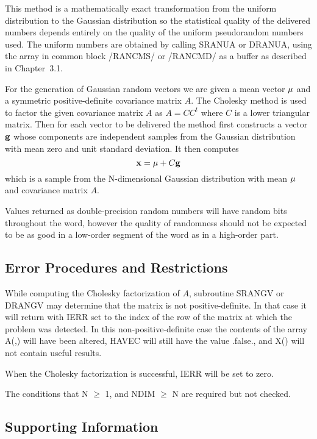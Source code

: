 \documentclass[twoside]{MATH77}
\begin{document}
This method is a mathematically exact transformation from the uniform
distribution to the Gaussian distribution so the statistical quality of the
delivered numbers depends entirely on the quality of the uniform
pseudorandom numbers used. The uniform numbers are obtained by calling
SRANUA or DRANUA, using the array in common block /RANCMS/ or /RANCMD/ as a
buffer as described in Chapter~3.1.

For the generation of Gaussian random vectors we are given a mean vector $%
{\bf \mu }$ and a symmetric positive-definite covariance matrix $A$. The
Cholesky method is used to factor the given covariance matrix $A$ as $A =
CC^t$ where $C$ is a lower triangular matrix. Then for each vector to be
delivered the method first constructs a vector ${\bf g}$ whose components
are independent samples from the Gaussian distribution with mean zero and
unit standard deviation. It then computes
$$
{\bf x} = {\bf \mu }+C{\bf g}
$$
which is a sample from the N-dimensional Gaussian distribution with mean $%
{\bf \mu }$ and covariance matrix $A$.

Values returned as double-precision random numbers will have random bits
throughout the word, however the quality of randomness should not be
expected to be as good in a low-order segment of the word as in a high-order
part.




\subsection{Error Procedures and Restrictions}

While computing the Cholesky factorization of $A$, subroutine SRANGV or
DRANGV may determine that the matrix is not positive-definite. In that case
it will return with IERR set to the index of the row of the matrix at which
the problem was detected. In this non-positive-definite case the contents of
the array A(,) will have been altered, HAVEC will still have the value
.false., and X() will not contain useful results.

When the Cholesky factorization is successful, IERR will be set to zero.

The conditions that N $\geq $ 1, and NDIM $\geq $ N are required but
not checked.

\subsection{Supporting Information}
\end{document}
